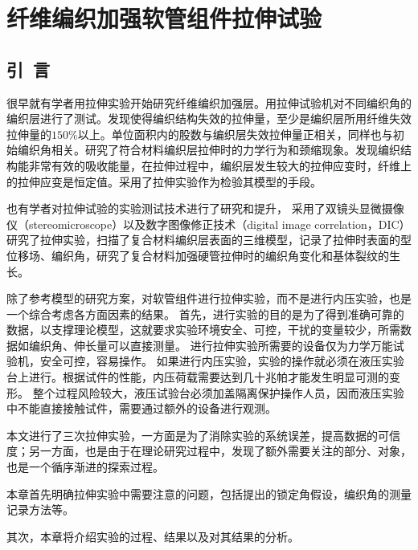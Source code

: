 
\chapter{纤维编织加强软管组件拉伸试验}
\section{引~言}

很早就有学者用拉伸实验开始研究纤维编织加强层。\citeauthor{brunnschweiler19545}\cite{brunnschweiler19545}用拉伸试验机对不同编织角的编织层进行了测试。发现使得编织结构失效的拉伸量，至少是编织层所用纤维失效拉伸量的$ 150\% $以上。单位面积内的股数与编织层失效拉伸量正相关，同样也与初始编织角相关。\citeauthor{Harte20001259}\cite{Harte20001259,Harte2000259}研究了符合材料编织层拉伸时的力学行为和颈缩现象。发现编织结构能非常有效的吸收能量，在拉伸过程中，编织层发生较大的拉伸应变时，纤维上的拉伸应变是恒定值。\citeauthor{Hachemi2011}\cite{Hachemi2011}采用了拉伸实验作为检验其模型的手段。


也有学者对拉伸试验的实验测试技术进行了研究和提升，\citeauthor{Leung2013}\cite{Leung2013}
采用了双镜头显微摄像仪（stereomicroscope）以及数字图像修正技术（digital image correlation，DIC）研究了拉伸实验，扫描了复合材料编织层表面的三维模型，记录了拉伸时表面的型位移场、编织角，研究了复合材料加强硬管拉伸时的编织角变化和基体裂纹的生长。


除了参考\hacite 模型的研究方案，对软管组件进行拉伸实验，而不是进行内压实验，也是一个综合考虑各方面因素的结果。
首先，进行实验的目的是为了得到准确可靠的数据，以支撑理论模型，这就要求实验环境安全、可控，干扰的变量较少，所需数据如编织角、伸长量可以直接测量。
进行拉伸实验所需要的设备仅为力学万能试验机，安全可控，容易操作。
如果进行内压实验，实验的操作就必须在液压实验台上进行。根据试件的性能，内压荷载需要达到几十兆帕才能发生明显可测的变形。
整个过程风险较大，液压试验台必须加盖隔离保护操作人员，因而液压实验中不能直接接触试件，需要通过额外的设备进行观测。

本文进行了三次拉伸实验，一方面是为了消除实验的系统误差，提高数据的可信度；另一方面，也是由于在理论研究过程中，发现了额外需要关注的部分、对象，也是一个循序渐进的探索过程。

本章首先明确拉伸实验中需要注意的问题，包括\ha 提出的锁定角假设，编织角的测量记录方法等。

其次，本章将介绍实验的过程、结果以及对其结果的分析。

